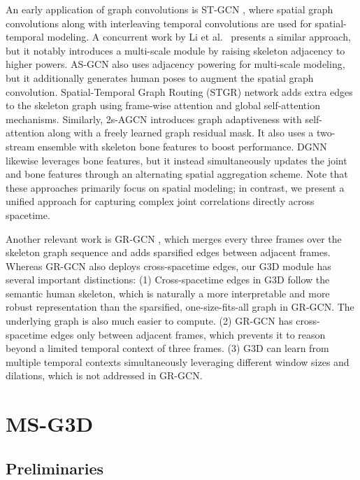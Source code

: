 \documentclass[10pt,twocolumn,letterpaper]{article}
\begin{document}
An early application of graph convolutions is ST-GCN \cite{ST-GCN}, where spatial graph convolutions along with interleaving temporal convolutions are used for spatial-temporal modeling.
A concurrent work by Li et al.~\cite{st-gcn-concur-18} presents a similar approach, but it notably introduces a multi-scale module by raising skeleton adjacency to higher powers. AS-GCN \cite{AS-GCN-skeleton-cvpr19} also uses adjacency powering for multi-scale modeling, but it additionally generates human poses to augment the spatial graph convolution. Spatial-Temporal Graph Routing (STGR) network \cite{st-graph-routing-skeleton-aaai19} adds extra edges to the skeleton graph using frame-wise attention and global self-attention mechanisms. Similarly, 2s-AGCN \cite{2s-AGCN} introduces graph adaptiveness with self-attention along with a freely learned graph residual mask. It also uses a two-stream ensemble with skeleton bone features to boost performance. DGNN \cite{dgnn} likewise leverages bone features, but it instead simultaneously updates the joint and bone features through an alternating spatial aggregation scheme. Note that these approaches primarily focus on spatial modeling; in contrast, we present a unified approach for capturing complex joint correlations directly across spacetime.

Another relevant work is GR-GCN \cite{GR-GCN}, which merges every three frames over the skeleton graph sequence and adds sparsified edges between adjacent frames. Whereas GR-GCN also deploys cross-spacetime edges, our G3D module has several important distinctions:
(1) Cross-spacetime edges in G3D follow the semantic human skeleton, which is naturally a more interpretable and more robust representation than the sparsified, one-size-fits-all graph in GR-GCN. The underlying graph is also much easier to compute.
(2) GR-GCN has cross-spacetime edges only between adjacent frames, which prevents it to reason beyond a limited temporal context of three frames.
(3) G3D can learn from multiple temporal contexts simultaneously leveraging different window sizes and dilations, which is not addressed in GR-GCN.


\section{MS-G3D}

\subsection{Preliminaries}
\end{document}
